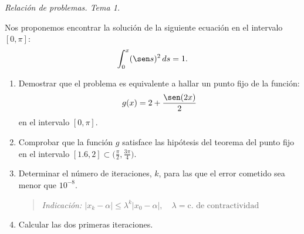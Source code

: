 \documentclass[11pt]{article}
\begin{document}
\begin{flushright}
  \LARGE\it Relación de problemas. Tema \huge 1.\\
  \bigskip
\end{flushright}

\begin{problemas}

   \begin{problema}
     Nos proponemos encontrar la solución de la siguiente ecuación en
     el intervalo $[0,\pi]$: 
     $$
     \int_0^x (\sen s)^2 \, ds = 1.
     $$
   \end{problema}
   \begin{enumerate}
   \item Demostrar que el problema es equivalente a hallar un punto
     fijo de la función:
     $$
     g(x)=2 + \frac{\sen(2x)}{2}
     $$
     en el intervalo $[0,\pi]$.
   \item Comprobar que la función $g$ satisface las hipótesis del
     teorema del punto fijo en el intervalo $\displaystyle [1.6,2]\subset
     \bigg(\frac{\pi}{2},\frac{3\pi}{4}\bigg)$.
   \item Determinar el número de iteraciones, $k$, para las que el
     error cometido sea menor que $10^{-8}$. 
      \begin{quote}\em\small
        Indicación:
        $|x_k-\alpha|\le \lambda^k|x_0-\alpha|,
        \quad\lambda=\text{c. de contractividad}$
    \end{quote}
  \item Calcular las dos primeras iteraciones.
   \end{enumerate}
  
  \end{problemas}
\end{document}
